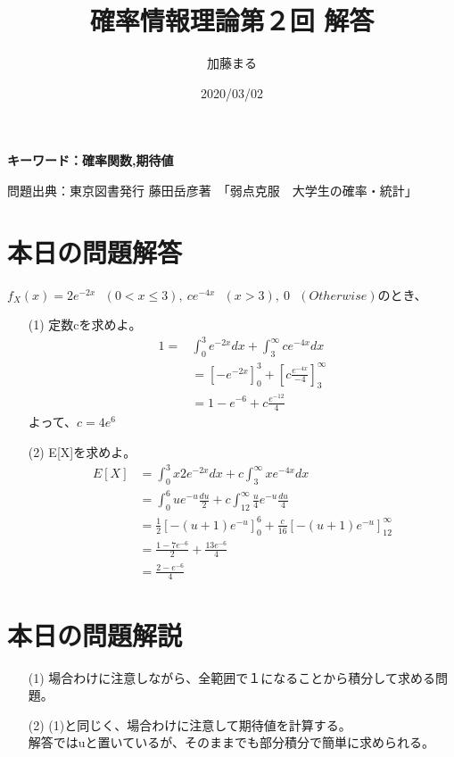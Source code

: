 \documentclass[a4j,uplatex,dvipdfmx]{jsarticle}
\title{確率情報理論第２回 解答}
\author{加藤まる}
\date{2020/03/02}
\begin{document}
\maketitle
\bf 
キーワード：確率関数,期待値\par
問題出典：東京図書発行 藤田岳彦著　「弱点克服　大学生の確率・統計」
\rm

\section*{本日の問題解答}
$f_X(x)=2e^{-2x}~~~(0<x\le 3),~ce^{-4x}~~~(x>3),~0~~~(Otherwise)$のとき、
\begin{itemize}
  \item[(1)] 定数cを求めよ。
   \begin{equation}
     \begin{split}
       1 =& \int_{0}^{3}e^{-2x}dx + \int_{3}^{\infty}ce^{-4x}dx\\
       & = \left[ -e^{-2x} \right]_0^3 + \left[ c \frac{e^{-4x}}{-4} \right]_3^\infty \\
       & = 1-e^{-6} + c\frac{e^{-12}}{4}
     \end{split}
   \end{equation}
   よって、$c=4e^6$
  \item[(2)] E[X]を求めよ。
  \begin{equation}
    \begin{split}
      E[X] &= \int_{0}^{3} x2e^{-2x} dx + c\int_{3}^{\infty}xe^{-4x}dx \\
      &= \int_{0}^{6} ue^{-u}\frac{du}{2} + c\int_{12}^{\infty}\frac{u}{4}e^{-u}\frac{du}{4} \\
      &= \frac{1}{2}\left[ -(u+1)e^{-u}  \right]_0^6 + \frac{c}{16}\left[ -(u+1)e^{-u} \right]_{12}^\infty \\
      &= \frac{1-7e^{-6}}{2} + \frac{13e^{-6}}{4} \\
      &= \frac{2-e^{-6}}{4}
    \end{split}
  \end{equation} 
\end{itemize}



\section*{本日の問題解説}
\begin{itemize}
  \item[(1)] 場合わけに注意しながら、全範囲で１になることから積分して求める問題。
  \item[(2)] (1)と同じく、場合わけに注意して期待値を計算する。\\ 
  解答ではuと置いているが、そのままでも部分積分で簡単に求められる。
\end{itemize}
\end{document}
